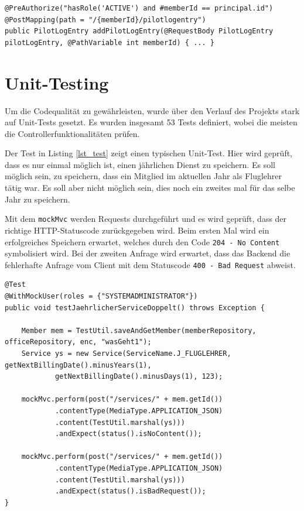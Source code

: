 \documentclass[a4paper, 11pt]{article}
\begin{document}
\begin{lstlisting}[caption=Beispiel Berechtigungsprüfung, label=lst_autho_meth]
@PreAuthorize("hasRole('ACTIVE') and #memberId == principal.id")
@PostMapping(path = "/{memberId}/pilotlogentry")
public PilotLogEntry addPilotLogEntry(@RequestBody PilotLogEntry pilotLogEntry, @PathVariable int memberId) { ... }
\end{lstlisting}

\section{Unit-Testing}

Um die Codequalität zu gewährleisten, wurde über den Verlauf des Projekts stark
auf Unit-Tests gesetzt. Es wurden insgesamt 53 Tests definiert, wobei die
meisten die Controllerfunktionalitäten prüfen.

Der Test in Listing \ref{lst_test} zeigt einen typischen Unit-Test. Hier wird
geprüft, dass es nur einmal möglich ist, einen jährlichen Dienst zu speichern.
Es soll möglich sein, zu speichern, dass ein Mitglied im aktuellen Jahr als
Fluglehrer tätig war. Es soll aber nicht möglich sein, dies noch ein zweites
mal für das selbe Jahr zu speichern.

Mit dem \lstinline{mockMvc} werden Requests durchgeführt und es wird
geprüft, dass der richtige HTTP-Statuscode zurückgegeben wird. Beim ersten Mal
wird ein erfolgreiches Speichern erwartet, welches durch den Code
\lstinline{204 - No Content} symbolisiert wird. Bei der zweiten Anfrage wird
erwartet, dass das Backend die fehlerhafte Anfrage vom Client mit dem
Statuscode \lstinline{400 - Bad Request} abweist.


\begin{lstlisting}[caption=Beispielhafter Unit-Test, label=lst_test, float]
@Test
@WithMockUser(roles = {"SYSTEMADMINISTRATOR"})
public void testJaehrlicherServiceDoppelt() throws Exception {

    Member mem = TestUtil.saveAndGetMember(memberRepository, officeRepository, enc, "wasGeht1");
    Service ys = new Service(ServiceName.J_FLUGLEHRER, getNextBillingDate().minusYears(1),
            getNextBillingDate().minusDays(1), 123);

    mockMvc.perform(post("/services/" + mem.getId())
            .contentType(MediaType.APPLICATION_JSON)
            .content(TestUtil.marshal(ys)))
            .andExpect(status().isNoContent());

    mockMvc.perform(post("/services/" + mem.getId())
            .contentType(MediaType.APPLICATION_JSON)
            .content(TestUtil.marshal(ys)))
            .andExpect(status().isBadRequest());
}
\end{lstlisting}
\end{document}

